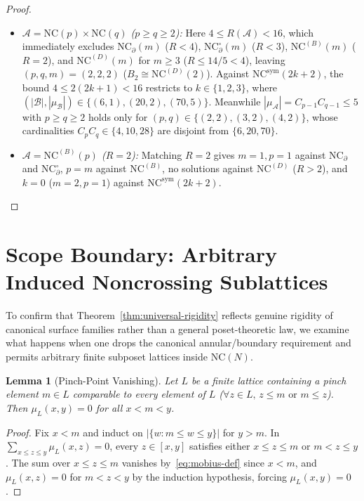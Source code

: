 \documentclass[11pt]{article}
\newtheorem{lemma}[theorem]{Lemma}
\theoremstyle{definition}
\newcommand{\NC}{\mathrm{NC}}
\newcommand{\NCB}{\mathrm{NC}^{(B)}}
\newcommand{\NCD}{\mathrm{NC}^{(D)}}
\newcommand{\NCsym}{\mathrm{NC}^{\mathrm{sym}}}
\begin{document}
\begin{proof}
\begin{itemize}
  \item \emph{$\mathcal{A} = \NC(p)\times\NC(q)$ ($p \ge q \ge 2$):} Here $4 \le R(\mathcal{A}) < 16$, which immediately excludes $\NC_\partial(m)$ ($R < 4$), $\NC_\partial^\circ(m)$ ($R < 3$), $\NCB(m)$ ($R = 2$), and $\NCD(m)$ for $m \ge 3$ ($R \le 14/5 < 4$), leaving $(p,q,m) = (2,2,2)$ ($B_2 \cong \NCD(2)$). Against $\NCsym(2k+2)$, the bound $4 \le 2(2k+1) < 16$ restricts to $k \in \{1,2,3\}$, where $(|\mathcal{B}|, |\mu_{\mathcal{B}}|) \in \{(6,1), (20,2), (70,5)\}$. Meanwhile $|\mu_{\mathcal{A}}| = C_{p-1}C_{q-1} \le 5$ with $p \ge q \ge 2$ holds only for $(p,q) \in \{(2,2), (3,2), (4,2)\}$, whose cardinalities $C_p C_q \in \{4, 10, 28\}$ are disjoint from $\{6, 20, 70\}$.
  \item \emph{$\mathcal{A} = \NCB(p)$ ($R = 2$):} Matching $R = 2$ gives $m = 1, p = 1$ against $\NC_\partial$ and $\NC_\partial^\circ$, $p = m$ against $\NCB$, no solutions against $\NCD$ ($R > 2$), and $k = 0$ ($m = 2, p = 1$) against $\NCsym(2k+2)$. \qedhere
\end{itemize}
\end{proof}

\section{Scope Boundary: Arbitrary Induced Noncrossing Sublattices}

To confirm that Theorem~\ref{thm:universal-rigidity} reflects genuine rigidity of canonical surface families rather than a general poset-theoretic law, we examine what happens when one drops the canonical annular/boundary requirement and permits arbitrary finite subposet lattices inside $\NC(N)$.

\begin{lemma}[Pinch-Point Vanishing]\label{lem:pinch}
Let $L$ be a finite lattice containing a pinch element $m \in L$ comparable to every element of $L$ ($\forall z \in L,\, z \le m \text{ or } m \le z$). Then $\mu_L(x, y) = 0$ for all $x < m < y$.
\end{lemma}
\begin{proof}
Fix $x < m$ and induct on $|\{w : m \le w \le y\}|$ for $y > m$. In $\sum_{x \le z \le y} \mu_L(x,z) = 0$, every $z \in [x, y]$ satisfies either $x \le z \le m$ or $m < z \le y$. The sum over $x \le z \le m$ vanishes by~\eqref{eq:mobius-def} since $x < m$, and $\mu_L(x,z) = 0$ for $m < z < y$ by the induction hypothesis, forcing $\mu_L(x,y) = 0$.
\end{proof}
\end{document}
